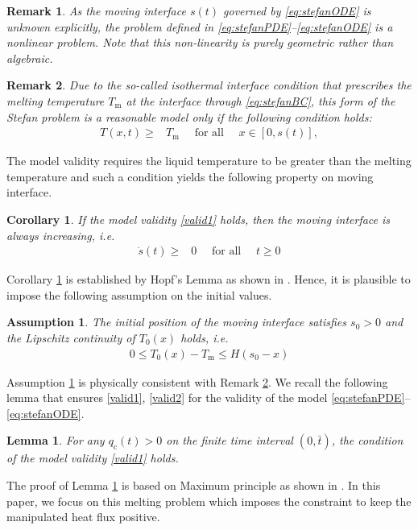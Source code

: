 \documentclass[journal]{IEEEtran}
\newtheorem{assum}{Assumption}
\newtheorem{coro}{Corollary}
\newtheorem{remark}{Remark}
\newtheorem{lem}{Lemma}
\begin{document}
\begin{remark}\emph{
 As the moving interface $s(t)$  governed by \eqref{eq:stefanODE} is unknown explicitly, the problem defined in  \eqref{eq:stefanPDE}--\eqref{eq:stefanODE}  is a nonlinear
problem. Note that this non-linearity is purely geometric
rather than algebraic.}\end{remark}
\begin{remark}\label{assumption}\emph{
Due to the so-called isothermal interface condition
 that prescribes the melting temperature $T_{{\mathrm m}}$ at the interface through  \eqref{eq:stefanBC},
this form of the Stefan problem is a reasonable model only if the following condition holds:
\begin{align}
\label{valid1}T(x,t) \geq& T_{{\mathrm m}} \quad \textrm{ for all }\quad x \in [0,s(t)],
\end{align}}
\end{remark}
The model validity requires the liquid temperature to be greater than the melting temperature and such a condition  yields the following property on moving interface. 
\begin{coro}\label{monoinc}
If the model validity \eqref{valid1} holds, then the moving interface is always increasing, i.e. 
\begin{align}
\label{valid2}\dot{s}(t)\geq&0 \quad \textrm{ for all }\quad t\geq0
\end{align}
\end{coro}
Corollary \ref{monoinc} is established by Hopf's Lemma as shown in \cite{Gupta03}. Hence, it is plausible to impose the following assumption on the initial values. 
\begin{assum}\label{assumini}
The initial position of the moving interface satisfies  $s_0>0$ and the Lipschitz continuity of $T_0(x)$ holds, i.e.  
\begin{align}\label{eq:stefanICbound}
0\leq T_0(x)-T_{{\mathrm m}}\leq H(s_0-x)
\end{align}
\end{assum}
Assumption \ref{assumini} is physically consistent with Remark \ref{assumption}. We recall the following lemma that ensures \eqref{valid1}, \eqref{valid2} for the validity of the model \eqref{eq:stefanPDE}--\eqref{eq:stefanODE}.
\begin{lem}\label{lemma1}
For any $q_{{\mathrm c}}(t)>0$ on the finite time interval $(0,\bar{t})$, the condition of the model validity \eqref{valid1} holds.
\end{lem}
The proof of Lemma \ref{lemma1} is based on Maximum principle as shown in \cite{Gupta03}. In this paper, we focus on this melting problem which imposes the constraint to keep the manipulated heat flux positive. 
\end{document}
